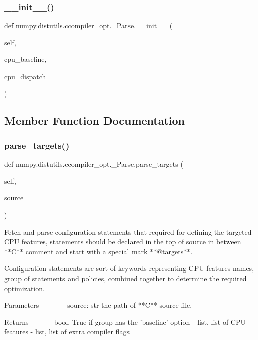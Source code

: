 \subsubsection{\texorpdfstring{\+\_\+\+\_\+init\+\_\+\+\_\+()}{\_\_init\_\_()}}
{\footnotesize\ttfamily def numpy.\+distutils.\+ccompiler\+\_\+opt.\+\_\+\+Parse.\+\_\+\+\_\+init\+\_\+\+\_\+ (\begin{DoxyParamCaption}\item[{}]{self,  }\item[{}]{cpu\+\_\+baseline,  }\item[{}]{cpu\+\_\+dispatch }\end{DoxyParamCaption})}



\subsection{Member Function Documentation}
\mbox{\label{classnumpy_1_1distutils_1_1ccompiler__opt_1_1__Parse_a1b04ad8127ca1410e8be8576623edd88}} 
\subsubsection{\texorpdfstring{parse\+\_\+targets()}{parse\_targets()}}
{\footnotesize\ttfamily def numpy.\+distutils.\+ccompiler\+\_\+opt.\+\_\+\+Parse.\+parse\+\_\+targets (\begin{DoxyParamCaption}\item[{}]{self,  }\item[{}]{source }\end{DoxyParamCaption})}

\begin{DoxyVerb}Fetch and parse configuration statements that required for
defining the targeted CPU features, statements should be declared
in the top of source in between **C** comment and start
with a special mark **@targets**.

Configuration statements are sort of keywords representing
CPU features names, group of statements and policies, combined
together to determine the required optimization.

Parameters
----------
source: str
    the path of **C** source file.

Returns
-------
- bool, True if group has the 'baseline' option
- list, list of CPU features
- list, list of extra compiler flags
\end{DoxyVerb}
 

